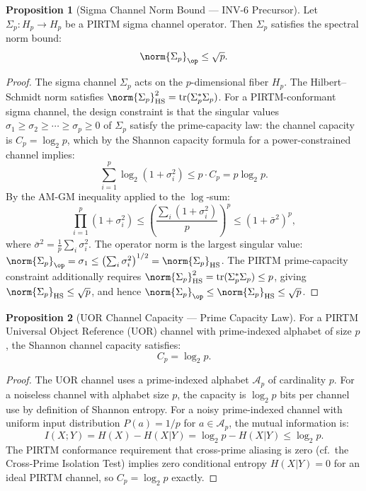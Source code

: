 \documentclass[12pt,letterpaper]{article}
\theoremstyle{definition}
\newtheorem{proposition}{Proposition}[section]
\theoremstyle{remark}
\begin{document}
\begin{proposition}[Sigma Channel Norm Bound --- INV-6 Precursor]
\label{prop:sigma_norm}
Let $\Sigma_p: H_p \to H_p$ be a PIRTM sigma channel operator. Then
$\Sigma_p$ satisfies the spectral norm bound:
\begin{equation}
  \norm{\Sigma_p}_\op \leq \sqrt{p}.
  \label{eq:sigma_bound}
\end{equation}
\end{proposition}

\begin{proof}
The sigma channel $\Sigma_p$ acts on the $p$-dimensional fiber $H_p$.
The Hilbert--Schmidt norm satisfies $\norm{\Sigma_p}_{\mathrm{HS}}^2
= \mathrm{tr}(\Sigma_p^*\Sigma_p)$.
For a PIRTM-conformant sigma channel, the design constraint is that
the singular values $\sigma_1 \geq \sigma_2 \geq \cdots \geq \sigma_p \geq 0$
of $\Sigma_p$ satisfy the prime-capacity law:
the channel capacity is $C_p = \log_2 p$, which by the Shannon capacity formula
for a power-constrained channel implies:
\[
  \sum_{i=1}^p \log_2(1 + \sigma_i^2) \leq p \cdot C_p = p\log_2 p.
\]
By the AM-GM inequality applied to the $\log$-sum:
\[
  \prod_{i=1}^p (1 + \sigma_i^2) \leq \left(\frac{\sum_i(1+\sigma_i^2)}{p}\right)^p
  \leq (1 + \bar\sigma^2)^p,
\]
where $\bar\sigma^2 = \frac{1}{p}\sum_i\sigma_i^2$.
The operator norm is the largest singular value:
$\norm{\Sigma_p}_\op = \sigma_1 \leq \left(\sum_i \sigma_i^2\right)^{1/2}
= \norm{\Sigma_p}_{\mathrm{HS}}$.
The PIRTM prime-capacity constraint additionally requires
$\norm{\Sigma_p}_{\mathrm{HS}}^2 = \mathrm{tr}(\Sigma_p^*\Sigma_p) \leq p$,
giving $\norm{\Sigma_p}_{\mathrm{HS}} \leq \sqrt{p}$,
and hence $\norm{\Sigma_p}_\op \leq \norm{\Sigma_p}_{\mathrm{HS}} \leq \sqrt{p}$.
\end{proof}

\begin{proposition}[UOR Channel Capacity --- Prime Capacity Law]
\label{prop:uor}
For a PIRTM Universal Object Reference (UOR) channel with prime-indexed
alphabet of size $p$, the Shannon channel capacity satisfies:
\begin{equation}
  C_p = \log_2 p.
\end{equation}
\end{proposition}

\begin{proof}
The UOR channel uses a prime-indexed alphabet $\mathcal{A}_p$ of cardinality $p$.
For a noiseless channel with alphabet size $p$, the capacity is
$\log_2 p$ bits per channel use by definition of Shannon entropy.
For a noisy prime-indexed channel with uniform input distribution
$P(a) = 1/p$ for $a \in \mathcal{A}_p$, the mutual information is:
\[
  I(X;Y) = H(X) - H(X|Y) = \log_2 p - H(X|Y) \leq \log_2 p.
\]
The PIRTM conformance requirement that cross-prime aliasing is zero
(cf.\ the Cross-Prime Isolation Test) implies zero conditional entropy
$H(X|Y) = 0$ for an ideal PIRTM channel, so $C_p = \log_2 p$ exactly.
\end{proof}
\end{document}
